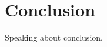 \documentclass[%
    corpo=12pt,
    twoside,
    oldstyle,
    autoretitolo,
    greek,
    evenboxes,
]{toptesi}
\begin{document}




\chapter{Conclusion}
Speaking about conclusion.




\end{document}
